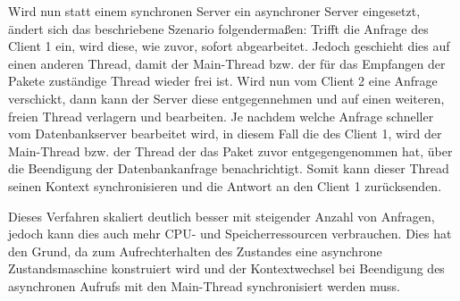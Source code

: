 Wird nun statt einem synchronen Server ein asynchroner Server eingesetzt, ändert sich das beschriebene Szenario folgendermaßen: Trifft die Anfrage des Client 1 ein, wird diese, wie zuvor, sofort abgearbeitet. Jedoch geschieht dies auf einen anderen Thread, damit der Main-Thread bzw. der für das Empfangen der Pakete zuständige Thread wieder frei ist. Wird nun vom Client 2 eine Anfrage verschickt, dann kann der Server diese entgegennehmen und auf einen weiteren, freien Thread verlagern und bearbeiten. Je nachdem welche Anfrage schneller vom Datenbankserver bearbeitet wird, in diesem Fall die des Client 1, wird der Main-Thread bzw. der Thread der das Paket zuvor entgegengenommen hat, über die Beendigung der Datenbankanfrage benachrichtigt. Somit kann dieser Thread seinen Kontext synchronisieren und die Antwort an den Client 1 zurücksenden.

Dieses Verfahren skaliert deutlich besser mit steigender Anzahl von Anfragen, jedoch kann dies auch mehr CPU- und Speicherressourcen verbrauchen. Dies hat den Grund, da zum Aufrechterhalten des Zustandes eine asynchrone Zustandsmaschine konstruiert wird und der Kontextwechsel bei Beendigung des asynchronen Aufrufs mit den Main-Thread synchronisiert werden muss.


